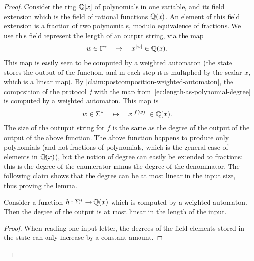 \begin{proof}
    Consider the ring  ${\mathbb Q}[x]$ of polynomials in one variable, and its field extension which is the field of rational functions ${\mathbb Q}(x)$. An element of this field extension is a fraction of two polynomials, modulo equivalence of fractions.  We use this field represent the length of an output string, via the map 
    \begin{align}\label{eq:length-as-polynomial-degree}
    w \in \Gamma^* 
    \quad \mapsto \quad 
    x^{|w|} \in {\mathbb Q}(x).
    \end{align}
    This map is easily seen to be computed by a weighted automaton (the state stores the output of the function, and in each step it is multiplied by the scalar $x$, which is a linear map). By \cref{claim:postcomposition-weighted-automaton}, the composition of the protocol $f$ with the map from~\eqref{eq:length-as-polynomial-degree} is computed by a weighted automaton. This map is 
    \begin{align*}
    w \in \Sigma^* \quad \mapsto \quad x^{|f(w)|} \in {\mathbb Q}(x).
    \end{align*}
    The size of the outuput string for $f$ is the same as the degree of the output of the output of the above function. The above function happens to produce only polynomials (and not fractions of polynomials, which is the general case of elements in ${\mathbb Q}(x)$), but the notion of degree can easily be extended to fractions: this is the degree of the enumerator minus the degree of the denominator. The following claim shows that the degree can be at most linear in the input size, thus proving the lemma. 
    \begin{claim}
        Consider a function $h : \Sigma^* \to {\mathbb Q}(x)$ which is computed by a weighted automaton. Then the degree of the output is at most linear in the length of the input.
    \end{claim}
    \begin{proof}
        When reading one input letter, the degrees of the field elements stored in the state can only increase by a constant amount.
    \end{proof}
\end{proof}




